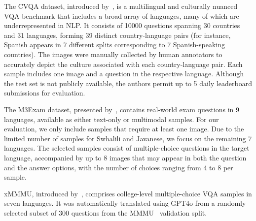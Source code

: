 %
%
The CVQA dataset, introduced by~\cite{romero2024cvqa}, is a multilingual and culturally nuanced VQA benchmark that includes a broad array of languages, many of which are underrepresented in NLP. It consists of 10000 questions spanning 30 countries and 31 languages, forming 39 distinct country-language pairs (for instance, Spanish appears in 7 different splits corresponding to 7 Spanish-speaking countries). The images were manually collected by human annotators to accurately depict the culture associated with each country-language pair. Each sample includes one image and a question in the respective language. Although the test set is not publicly available, the authors permit up to 5 daily leaderboard submissions for evaluation.

%
%
The M3Exam dataset, presented by~\cite{zhang_m3exam_2023}, contains real-world exam questions in 9 languages, available as either text-only or multimodal samples. For our evaluation, we only include samples that require at least one image. Due to the limited number of samples for Swhalili and Javanese, we focus on the remaining 7 languages. The selected samples consist of multiple-choice questions in the target language, accompanied by up to 8 images that may appear in both the question and the answer options, with the number of choices ranging from 4 to 8 per sample.

%
%
xMMMU, introduced by~\cite{yue2024pangea}, comprises college-level multiple-choice VQA samples in seven languages. It was automatically translated using GPT4o from a randomly selected subset of 300 questions from the MMMU~\cite{yue_mmmu_2023} validation split.

